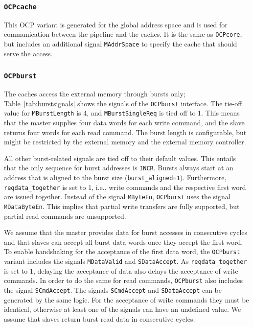 \documentclass[a4paper,fontsize=10pt,twoside,DIV15,BCOR12mm,headinclude=true,footinclude=false,pagesize,bibtotoc]{scrbook}
\newcommand{\code}[1]{{\texttt{#1}}}
\newcommand{\comment}[3]{

\textsf{\textbf{#1}} {\color{#3}#2}}
\newcommand{\wolf}[1]{\comment{Wolfgang}{#1}{OliveGreen}}
\newcommand{\martin}[1]{\comment{Martin}{#1}{Blue}}
\renewcommand{\wolf}[1]{}
\renewcommand{\martin}[1]{}
\begin{document}
\subsubsection{\code{OCPcache}}

This OCP variant is generated for the global address space and is used
for communication between the pipeline and the caches. It is the same
as \code{OCPcore}, but includes an additional signal \code{MAddrSpace}
to specify the cache that should serve the access.

\subsubsection{\code{OCPburst}}

The caches access the external memory through bursts only;
Table~\ref{tab:burstsignals} shows the signals of the \code{OCPburst}
interface. The tie-off value for \code{MBurstLength} is 4, and
\code{MBurstSingleReq} is tied off to 1. This means that the master
supplies four data words for each write command, and the slave returns
four words for each read command. The burst length is configurable,
but might be restricted by the external memory and the external
memory controller.
\martin{I assume (hope) that the configurable burst length works.
One could try varying with the SRAM memory.} 
\wolf{Depends on how cleanly the code was written and on the
  hardware. The synchronous SRAM only supports burst lengths $\leq$4
  due to restrictions of the memory chip.}
All other burst-related signals are
tied off to their default values. This entails that the only sequence
for burst addresses is \code{INCR}. Bursts always start at an address
that is aligned to the burst size
(\code{burst\_aligned=1}). Furthermore, \code{reqdata\_together} is
set to 1, i.e., write commands and the respective first word are
issued together. Instead of the signal \code{MByteEn}, \code{OCPburst}
uses the signal \code{MDataByteEn}. This implies that partial write
transfers are fully supported, but partial read commands are
unsupported.

We assume that the master provides data for burst accesses in
consecutive cycles and that slaves can accept all burst data words
once they accept the first word. To enable handshaking for the
acceptance of the first data word, the \code{OCPburst} variant
includes the signals \code{MDataValid} and \code{SDataAccept}. As
\code{reqdata\_together} is set to 1, delaying the acceptance of data
also delays the acceptance of write commands. In order to do the same
for read commands, \code{OCPburst} also includes the signal
\code{SCmdAccept}. The signals \code{SCmdAccept} and
\code{SDataAccept} can be generated by the same logic. For the
acceptance of write commands they must be identical, otherwise at
least one of the signals can have an undefined value. We assume that
slaves return burst read data in consecutive cycles.
\end{document}
